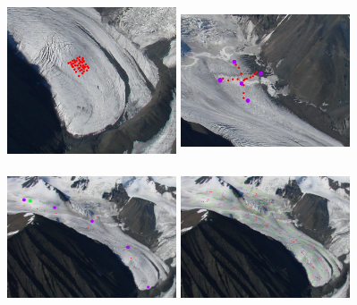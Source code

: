 \documentclass[12pt]{article}
\begin{document}
\begin{figure}
\begin{minipage}[c][11cm][t]{.33\textwidth}
	\vspace*{\fill}
  \centering
  \includegraphics[width=5cm,height=4.5cm]{probe_cell.jpeg}
  \par\vfill
  \includegraphics[width=5cm,height=4.5cm]{probe_curvature.jpeg}
\end{minipage}%
\begin{minipage}[c][11cm][t]{.33\textwidth}
	\vspace*{\fill}
  \centering
  \includegraphics[width=5cm,height=4.5cm]{probe_transect.jpeg}
\par\vfill
  \includegraphics[width=5cm,height=4.5cm]{probe_L.jpeg}

\end{minipage}
\end{figure}
\end{document}
